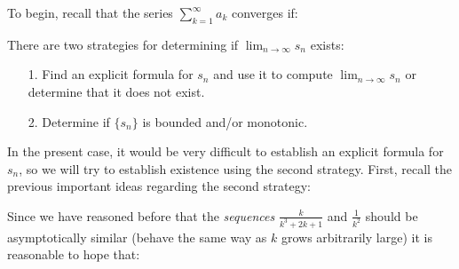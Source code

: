 \documentclass{ximera}
\begin{document}
\begin{exercise}
\begin{exercise}
To begin, recall that the series $\sum_{k=1}^{\infty}  a_k$ converges if:

\begin{multipleChoice}
\end{multipleChoice}

There are two strategies for determining if $\lim_{n \to \infty} s_n$ exists:

\begin{itemize}
\item[1.] Find an explicit formula for $s_n$ and use it to compute $\lim_{n \to \infty} s_n$ or determine that it does not exist.
\item[2.] Determine if $\{s_n\}$ is bounded and/or monotonic.   
\end{itemize}

In the present case, it would be very difficult to establish an explicit formula for $s_n$, so we will try to establish existence using the second strategy.  First, recall the previous important ideas regarding the second strategy:

\begin{selectAll}
\end{selectAll}

Since we have reasoned before that the \emph{sequences} $\frac{k}{k^3+2k+1}$ and $\frac{1}{k^2}$ should be asymptotically similar (behave the same way as $k$ grows arbitrarily large) it is reasonable to hope that:

\begin{multipleChoice}
\end{multipleChoice}


\end{exercise}
\end{exercise}
\end{document}
